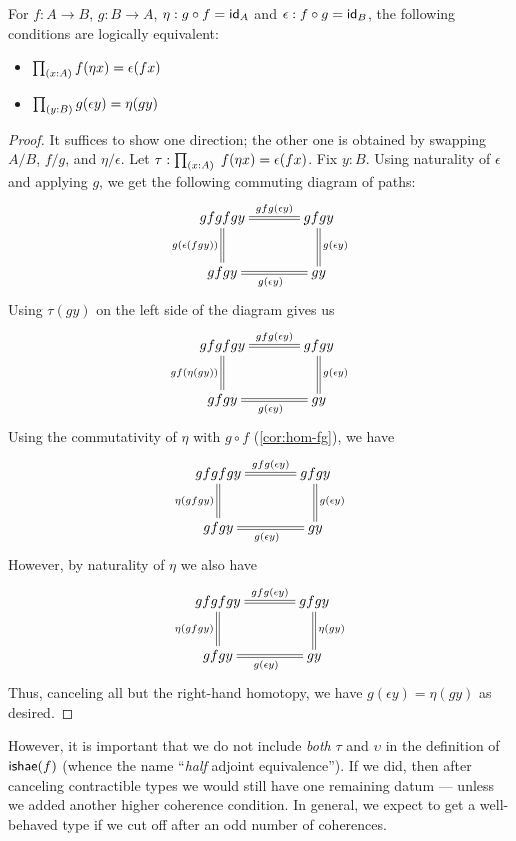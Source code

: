 \begin{lem}\label{lem:coh-equiv}
For $f : A \to B$, $g:B\to A$, $\eta: g \circ f = \idfunc[A]$ and $\epsilon:f \circ g = \idfunc[B]$, the following conditions are logically equivalent:
\begin{itemize}
\item $\prd{x:A} \map{f}{\eta x} = \epsilon(fx)$
\item $\prd{y:B} \map{g}{\epsilon y} = \eta(gy)$
\end{itemize}
\end{lem}
\begin{proof}
  It suffices to show one direction; the other one is obtained by swapping $A/B$, $f/g$, and $\eta/\epsilon$.
  Let $\tau : \prd{x:A}\;\map{f}{\eta x} = \epsilon(fx)$.
  Fix $y : B$.
  Using naturality of $\epsilon$ and applying $g$, we get the following commuting diagram of paths:
\[\uppercurveobject{{ }}\lowercurveobject{{ }}\twocellhead{{ }}
  \xymatrix@C=3pc{gfgfgy \ar@{=}^-{gfg(\epsilon y)}[r] \ar@{=}_{g(\epsilon (fgy))}[d] & gfgy \ar@{=}^{g(\epsilon y)}[d] \\ gfgy \ar@{=}_{g(\epsilon y)}[r] & gy
  }\]
Using $\tau(gy)$ on the left side of the diagram gives us
\[\uppercurveobject{{ }}\lowercurveobject{{ }}\twocellhead{{ }}
  \xymatrix@C=3pc{gfgfgy \ar@{=}^-{gfg(\epsilon y)}[r] \ar@{=}_{gf(\eta (gy))}[d] & gfgy \ar@{=}^{g(\epsilon y)}[d] \\ gfgy \ar@{=}_{g(\epsilon y)}[r] & gy
  }\]
Using the commutativity of $\eta$ with $g \circ f$ (\autoref{cor:hom-fg}), we have
\[\uppercurveobject{{ }}\lowercurveobject{{ }}\twocellhead{{ }}
  \xymatrix@C=3pc{gfgfgy \ar@{=}^-{gfg(\epsilon y)}[r] \ar@{=}_{\eta (gfgy)}[d] & gfgy \ar@{=}^{g(\epsilon y)}[d] \\ gfgy \ar@{=}_{g(\epsilon y)}[r] & gy
  }\]
However, by naturality of $\eta$ we also have
\[\uppercurveobject{{ }}\lowercurveobject{{ }}\twocellhead{{ }}
  \xymatrix@C=3pc{gfgfgy \ar@{=}^-{gfg(\epsilon y)}[r] \ar@{=}_{\eta (gfgy)}[d] & gfgy \ar@{=}^{\eta(gy)}[d] \\ gfgy \ar@{=}_{g(\epsilon y)}[r] & gy 
  }\]
Thus, canceling all but the right-hand homotopy, we have $g(\epsilon y) = \eta(g y)$ as desired.
\end{proof}

However, it is important that we do not include \emph{both} $\tau$ and $\upsilon$ in the definition of $\ishae (f)$ (whence the name ``\emph{half} adjoint equivalence'').
If we did, then after canceling contractible types we would still have one remaining datum --- unless we added another higher coherence condition.
In general, we expect to get a well-behaved type if we cut off after an odd number of coherences.

